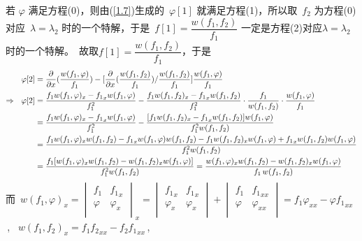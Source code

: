 若 $\varphi$ 满足方程(0)，则由(\ref{1.7})生成的\ $\varphi[1]$ 就满足方程(1)，所以取\ $f_2$ 为方程(0)对应\ $\lambda = \lambda_2$ 时的一个特解，于是\ $f[1] = \dfrac{w(f_1, f_2)}{f_1}$ 一定是方程(2)对应$\lambda = \lambda_2$ 时的一个特解。\ 故取$f[1] = \dfrac{w(f_1, f_2)}{f_1}$，于是
\begin{align}
\varphi[2] &= \frac{\partial}{\partial x}(\frac{w(f_1, \varphi)}{f_1}) - [\frac{\partial}{\partial x}(\frac{w(f_1, f_2)}{f_1})/\frac{w(f_1, f_2)}{f_1}]\frac{w(f_1, \varphi)}{f_1} \notag \\
\Rightarrow\ \ \varphi[2] &= \frac{f_1 w(f_1, \varphi)_x - {f_1}_x w(f_1, \varphi)}{f_1^2} - \frac{f_1 w(f_1, f_2)_x - {f_1}_x w(f_1, f_2)}{f_1^2} \cdot \frac{f_1}{w(f_1, f_2)} \cdot \frac{w(f_1, \varphi)}{f_1} \notag \\
&= \frac{f_1 w(f_1, \varphi)_x - {f_1}_x w(f_1, \varphi)}{f_1^2} - \frac{[f_1 w(f_1, f_2)_x - {f_1}_x w(f_1, f_2)] w(f_1, \varphi)}{f_1^2 w(f_1, f_2)} \notag \\
& = \frac{f_1 w(f_1, \varphi)_x w(f_1, f_2) - {{f_1}_x w(f_1, \varphi) w(f_1, f_2)} - f_1 w(f_1, f_2)_x w(f_1, \varphi) + {{f_1}_x w(f_1, f_2) w(f_1, \varphi)}}{f_1^2 w(f_1, f_2)} \notag \\
& = \frac{f_1[ w(f_1, \varphi)_x w(f_1, f_2) - w(f_1, f_2)_x w(f_1, \varphi)]}{f_1^2 w(f_1, f_2)}
=\frac{ w(f_1, \varphi)_x w(f_1, f_2) - w(f_1, f_2)_x w(f_1, \varphi)}{f_1\, w(f_1, f_2)}  \label{1.8}
\end{align}
而\  $w(f_1, \varphi)_x =
\begin{vmatrix}
f_1 & {f_1}_x \\
\varphi & \varphi_x \\
\end{vmatrix}_x =
\begin{vmatrix}
{f_1}_x & {f_1}_x \\
\varphi_x & \varphi_x \\
\end{vmatrix} +
\begin{vmatrix}
f_1 & {f_1}_{xx} \\
\varphi & \varphi_{xx} \\
\end{vmatrix} =
f_1 \varphi_{xx} - \varphi {f_1}_{xx}$ \,, \
$w(f_1, f_2)_x = f_1 {f_2}_{xx} - f_2 {f_1}_{xx}$\,, \\

